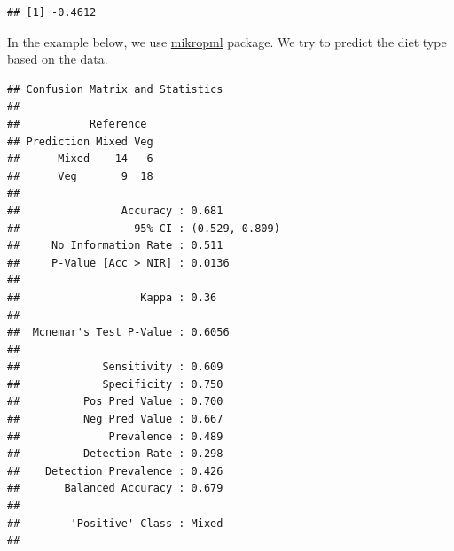 \documentclass[
]{book}
\newenvironment{Shaded}{\begin{snugshade}}{\end{snugshade}}
\newcommand{\AttributeTok}[1]{\textcolor[rgb]{0.77,0.63,0.00}{#1}}
\newcommand{\CommentTok}[1]{\textcolor[rgb]{0.56,0.35,0.01}{\textit{#1}}}
\newcommand{\DecValTok}[1]{\textcolor[rgb]{0.00,0.00,0.81}{#1}}
\newcommand{\FloatTok}[1]{\textcolor[rgb]{0.00,0.00,0.81}{#1}}
\newcommand{\FunctionTok}[1]{\textcolor[rgb]{0.00,0.00,0.00}{#1}}
\newcommand{\NormalTok}[1]{#1}
\newcommand{\OtherTok}[1]{\textcolor[rgb]{0.56,0.35,0.01}{#1}}
\newcommand{\SpecialCharTok}[1]{\textcolor[rgb]{0.00,0.00,0.00}{#1}}
\newcommand{\StringTok}[1]{\textcolor[rgb]{0.31,0.60,0.02}{#1}}
\begin{document}
\begin{verbatim}
## [1] -0.4612
\end{verbatim}

In the example below, we use \href{https://journals.asm.org/doi/10.1128/mBio.00434-20}{mikropml}
package. We try to predict the diet type based on the data.

\begin{Shaded}
\end{Shaded}

\begin{verbatim}
## Confusion Matrix and Statistics
## 
##           Reference
## Prediction Mixed Veg
##      Mixed    14   6
##      Veg       9  18
##                                         
##                Accuracy : 0.681         
##                  95% CI : (0.529, 0.809)
##     No Information Rate : 0.511         
##     P-Value [Acc > NIR] : 0.0136        
##                                         
##                   Kappa : 0.36          
##                                         
##  Mcnemar's Test P-Value : 0.6056        
##                                         
##             Sensitivity : 0.609         
##             Specificity : 0.750         
##          Pos Pred Value : 0.700         
##          Neg Pred Value : 0.667         
##              Prevalence : 0.489         
##          Detection Rate : 0.298         
##    Detection Prevalence : 0.426         
##       Balanced Accuracy : 0.679         
##                                         
##        'Positive' Class : Mixed         
## 
\end{verbatim}
\end{document}
